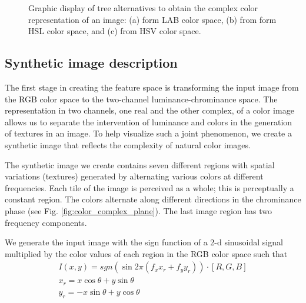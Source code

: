\documentclass[journal]{IEEEtran}
\begin{document}
\begin{figure}[!ht]
\begin{subfigure}[b]{0.15\textwidth}
		\caption{ }	
		\label{fig:hsv_complex_color}
	\end{subfigure}
	
	\caption{Graphic display of tree alternatives to obtain the complex color representation of an image: (a) form LAB color space, (b) from form HSL color space, and (c) from HSV color space.}
	\label{fig:complex_color_spaces}
\end{figure}



\subsection{Synthetic image description}
The first stage in creating the feature space is transforming the input image from the RGB color space to the two-channel luminance-chrominance space. The representation in two channels, one real and the other complex, of a color image allows us to separate the intervention of luminance and colors in the generation of textures in an image. To help visualize such a joint phenomenon, we create a synthetic image that reflects the complexity of natural color images.

The synthetic image we create contains seven different regions with spatial variations (textures) generated by alternating various colors at different frequencies. Each tile of the image is perceived as a whole; this is perceptually a constant region. The colors alternate along different directions in the chrominance phase (see Fig. \ref{fig:color_complex_plane}). The last image region has two frequency components.

We generate the input image with the sign function of a 2-d sinusoidal signal multiplied by the color values of each region in the RGB color space such that
\begin{gather}
	I(x, y) = sgn( \sin 2 \pi (f_x x_r + f_y y_r)) \cdot [R, G, B]\label{eq:2D_squared_signal}\\
	x_r = x \cos\theta + y \sin\theta \nonumber \\
    y_r = -x \sin\theta + y \cos\theta \nonumber  
\end{gather}
\end{document}
